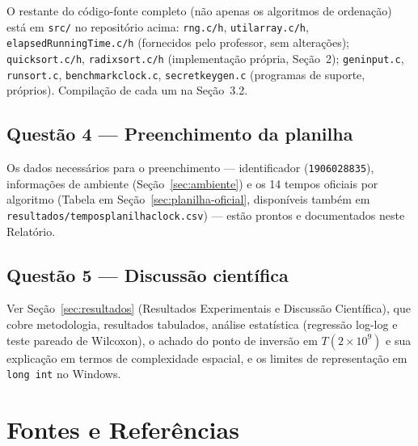 \documentclass[11pt,a4paper]{article}
\newcommand{\barra}{/\allowbreak}
\renewcommand{\_}{\underscoreoriginal\allowbreak}
\begin{document}
O restante do código-fonte completo (não apenas os algoritmos de
ordenação) está em \texttt{src/} no repositório acima:
\texttt{rng.c\barra{}h}, \texttt{utilarray.c\barra{}h},
\texttt{elapsedRunningTime.c\barra{}h} (fornecidos pelo professor, sem
alterações); \texttt{quicksort.c\barra{}h}, \texttt{radixsort.c\barra{}h}
(implementação própria, Seção~2); \texttt{gen\_input.c},
\texttt{run\_sort.c}, \texttt{benchmark\_clock.c},
\texttt{secretkey\_gen.c} (programas de suporte, próprios). Compilação de
cada um na Seção~3.2.

\subsection{Questão 4 --- Preenchimento da planilha}

Os dados necessários para o preenchimento --- identificador
(\texttt{1906028835}), informações de ambiente (Seção~\ref{sec:ambiente})
e os 14 tempos oficiais por algoritmo (Tabela em
Seção~\ref{sec:planilha-oficial}, disponíveis também em
\texttt{resultados\barra{}tempos\_planilha\_clock.csv}) --- estão prontos
e documentados neste Relatório.

\subsection{Questão 5 --- Discussão científica}

Ver Seção~\ref{sec:resultados} (Resultados Experimentais e Discussão
Científica), que cobre metodologia, resultados tabulados, análise
estatística (regressão log-log e teste pareado de Wilcoxon), o achado do
ponto de inversão em $T(2\times10^9)$ e sua explicação em termos de
complexidade espacial, e os limites de representação em
\texttt{long int} no Windows.

\section{Fontes e Referências}
\end{document}
